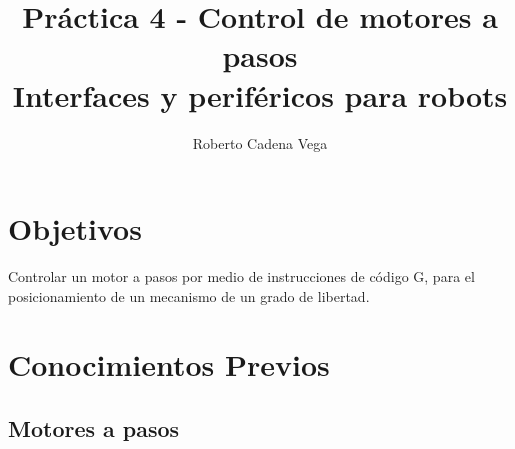 



\title{Práctica 4 - Control de motores a pasos\\Interfaces y periféricos para robots}
\author{Roberto Cadena Vega} %
\date{}



\maketitle %


\section{Objetivos}

	Controlar un motor a pasos por medio de instrucciones de código G, para el posicionamiento de un mecanismo de un grado de libertad.


\section{Conocimientos Previos}


	\subsection{Motores a pasos}

